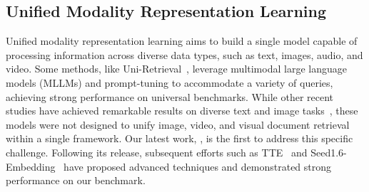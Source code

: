 \subsection{Unified Modality Representation Learning}

Unified modality representation learning aims to build a single model capable of processing information across diverse data types, such as text, images, audio, and video. Some methods, like Uni-Retrieval~\citep{jia2025uni}, leverage multimodal large language models (MLLMs) and prompt-tuning to accommodate a variety of queries, achieving strong performance on universal benchmarks. While other recent studies have achieved remarkable results on diverse text and image tasks~\citep{gme,b3,metaembed,vlm2vec}, these models were not designed to unify image, video, and visual document retrieval within a single framework. Our latest work, \model, is the first to address this specific challenge. Following its release, subsequent efforts such as TTE~\citep{tte} and Seed1.6-Embedding~\citep{seed16embedding} have proposed advanced techniques and demonstrated strong performance on our \benchmark benchmark.

